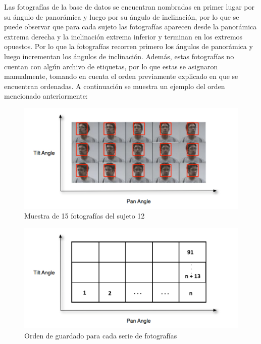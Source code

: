 Las fotografías de la base de datos se encuentran nombradas en primer lugar por su ángulo de panorámica y luego por su ángulo de inclinación, por lo que se puede observar que para cada sujeto las fotografías aparecen desde la panorámica extrema derecha y la inclinación extrema inferior y terminan en los extremos opuestos. Por lo que la fotografías recorren primero los ángulos de panorámica y luego incrementan los ángulos de inclinación. Además, estas fotografías no cuentan con algún archivo de etiquetas, por lo que estas se asignaron manualmente, tomando en cuenta el orden previamente explicado en que se encuentran ordenadas. A continuación se muestra un ejemplo del orden mencionado anteriormente:

\begin{figure}[H]
	\centering
	\includegraphics[scale=1]{figures/tiltpan.png}
	\caption{Muestra de 15 fotografías del sujeto 12 \cite{Gourier_Hall_Crowley}}
	\label{fig:img0}
\end{figure}

\begin{figure}[H]
	\centering
	\includegraphics[scale=1]{figures/faceorder.png}
	\caption{Orden de guardado para cada serie de fotografías}
	\label{fig:img1}
\end{figure}

